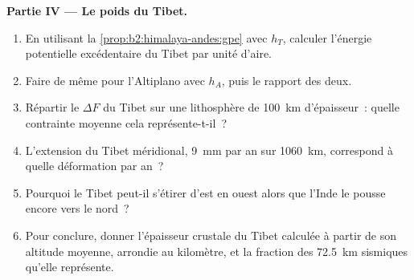 \begin{problem}
\noindent\textbf{Partie IV --- Le poids du Tibet.}
\begin{enumerate}[resume]
\item En utilisant la \cref{prop:b2:himalaya-andes:gpe} avec $h_T$,
calculer l'énergie potentielle excédentaire du Tibet par unité d'aire.
\item Faire de même pour l'Altiplano avec $h_A$, puis le rapport des deux.
\item Répartir le $\Delta F$ du Tibet sur une lithosphère de \qty{100}{km}
d'épaisseur~: quelle contrainte moyenne cela représente-t-il~?
\item L'extension du Tibet méridional, \qty{9}{mm} par an
sur \qty{1060}{km}, correspond à quelle déformation par an~?
\item Pourquoi le Tibet peut-il s'étirer d'est en ouest alors que l'Inde le pousse encore vers le nord~?
\item Pour conclure, donner l'épaisseur crustale du Tibet calculée à partir de son altitude
moyenne, arrondie au kilomètre, et la fraction des \qty{72.5}{km} sismiques qu'elle représente.
\end{enumerate}
\end{problem}
